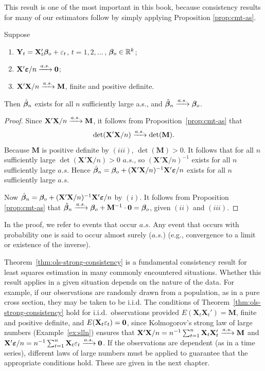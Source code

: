 This result is one of the most important in this book, because consistency
results for many of our estimators follow by simply applying Proposition
\ref{prop:cmt-as}.

\begin{theorem}\label{thm:ols-strong-consistency}
Suppose
\begin{enumerate}[label=$(\roman*)$]
\item $\mathbf{Y}_t = \mathbf{X}_t'\boldsymbol{\beta}_o + \varepsilon_t$, \quad $t = 1, 2, \ldots$\,, $\boldsymbol{\beta}_o \in \mathbb{R}^k$;
\item $\mathbf{X}'\boldsymbol{\varepsilon}/n \xrightarrow{a.s.} \mathbf{0}$;
\item $\mathbf{X}'\mathbf{X}/n \xrightarrow{a.s.} \mathbf{M}$, finite and positive definite.
\end{enumerate}
Then $\hat{\boldsymbol{\beta}}_n$ exists for all $n$ sufficiently large a.s., and $\hat{\boldsymbol{\beta}}_n \xrightarrow{a.s.} \boldsymbol{\beta}_o$.
\end{theorem}

\begin{proof}
Since $\mathbf{X}'\mathbf{X}/n \xrightarrow{a.s.} \mathbf{M}$, it follows from Proposition~\ref{prop:cmt-as} that
\[
\det(\mathbf{X}'\mathbf{X}/n) \xrightarrow{a.s.} \det(\mathbf{M}).
\]
Because $\mathbf{M}$ is positive definite by $(iii)$, $\det(\mathbf{M}) > 0$. It follows that for
all $n$ sufficiently large $\det(\mathbf{X}'\mathbf{X}/n) > 0$ $a.s.$, so $(\mathbf{X}'\mathbf{X}/n)^{-1}$ exists for all $n$
sufficiently large $a.s.$ Hence $\hat{\boldsymbol{\beta}}_n = \boldsymbol{\beta}_o + (\mathbf{X}'\mathbf{X}/n)^{-1}\mathbf{X}'\boldsymbol{\varepsilon}/n$ exists for all $n$
sufficiently large $a.s.$

Now $\hat{\boldsymbol{\beta}}_n = \boldsymbol{\beta}_o + (\mathbf{X}'\mathbf{X}/n)^{-1}\mathbf{X}'\boldsymbol{\varepsilon}/n$ by $(i)$. It follows from Proposition
\ref{prop:cmt-as} that $\hat{\boldsymbol{\beta}}_n \xrightarrow{a.s.} \boldsymbol{\beta}_o + \mathbf{M}^{-1} \cdot \mathbf{0} = \boldsymbol{\beta}_o$, given $(ii)$ and $(iii)$.
\end{proof}

In the proof, we refer to events that occur $a.s.$ Any event that occurs
with probability one is said to occur almost surely ($a.s.$) (e.g., convergence
to a limit or existence of the inverse).

Theorem~\ref{thm:ols-strong-consistency} is a fundamental consistency result for least squares estimation in many commonly encountered situations. Whether this result
applies in a given situation depends on the nature of the data. For example, if our observations are randomly drawn from a population, as in a
pure cross section, they may be taken to be i.i.d. The conditions of Theorem~\ref{thm:ols-strong-consistency} hold for i.i.d.\ observations provided $E(\mathbf{X}_t\mathbf{X}_t') = \mathbf{M}$, finite and
positive definite, and $E(\mathbf{X}_t\varepsilon_t) = \mathbf{0}$, since Kolmogorov's strong law of large
numbers (Example~\ref{ex:slln}) ensures that $\mathbf{X}'\mathbf{X}/n = n^{-1}\sum_{t=1}^n \mathbf{X}_t\mathbf{X}_t' \xrightarrow{a.s.} \mathbf{M}$
and $\mathbf{X}'\boldsymbol{\varepsilon}/n = n^{-1}\sum_{t=1}^n \mathbf{X}_t\varepsilon_t \xrightarrow{a.s.} \mathbf{0}$. If the observations are dependent (as
in a time series), different laws of large numbers must be applied to guarantee that the appropriate conditions hold. These are given in the next
chapter.

